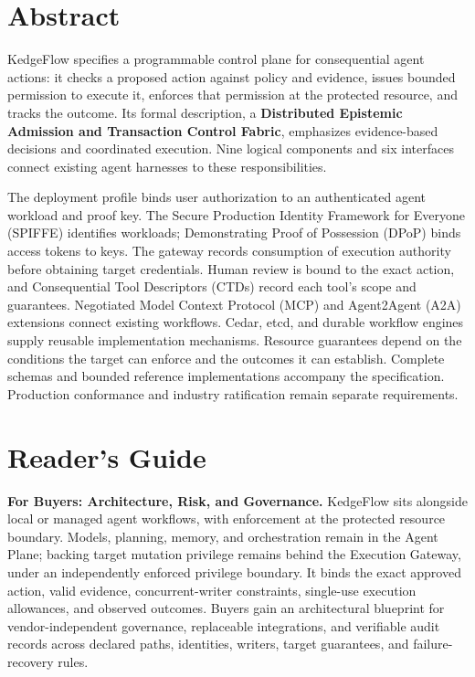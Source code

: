 \section*{Abstract}

KedgeFlow specifies a programmable control plane for consequential agent actions: it checks a proposed action against policy and evidence, issues bounded permission to execute it, enforces that permission at the protected resource, and tracks the outcome. Its formal description, a \textbf{Distributed Epistemic Admission and Transaction Control Fabric}, emphasizes evidence-based decisions and coordinated execution. Nine logical components and six interfaces connect existing agent harnesses to these responsibilities.

The deployment profile binds user authorization to an authenticated agent workload and proof key. The Secure Production Identity Framework for Everyone (SPIFFE) identifies workloads; Demonstrating Proof of Possession (DPoP) binds access tokens to keys. The gateway records consumption of execution authority before obtaining target credentials. Human review is bound to the exact action, and Consequential Tool Descriptors (CTDs) record each tool's scope and guarantees. Negotiated Model Context Protocol (MCP) and Agent2Agent (A2A) extensions connect existing workflows. Cedar, etcd, and durable workflow engines supply reusable implementation mechanisms. Resource guarantees depend on the conditions the target can enforce and the outcomes it can establish. Complete schemas and bounded reference implementations accompany the specification. Production conformance and industry ratification remain separate requirements.

\vspace{-4pt}
\section*{Reader's Guide}
\vspace{-2pt}


\vspace{-2pt}
\noindent\textbf{For Buyers: Architecture, Risk, and Governance.}
KedgeFlow sits alongside local or managed agent workflows, with enforcement at the protected resource boundary. Models, planning, memory, and orchestration remain in the Agent Plane; backing target mutation privilege remains behind the Execution Gateway, under an independently enforced privilege boundary. It binds the exact approved action, valid evidence, concurrent-writer constraints, single-use execution allowances, and observed outcomes. Buyers gain an architectural blueprint for vendor-independent governance, replaceable integrations, and verifiable audit records across declared paths, identities, writers, target guarantees, and failure-recovery rules.

